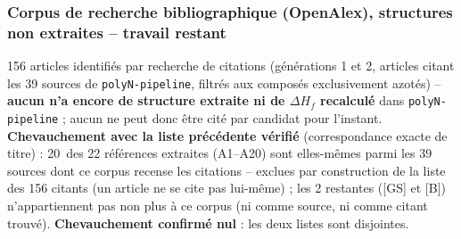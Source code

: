 \subsubsection*{Corpus de recherche bibliographique (OpenAlex), structures non extraites -- travail restant}
156 articles identifi\'es par recherche de citations (g\'en\'erations 1 et 2, articles citant les 39 sources de \texttt{polyN-pipeline}, filtr\'es aux compos\'es exclusivement azot\'es) -- \textbf{aucun n'a encore de structure extraite ni de $\Delta H_f$ recalcul\'e} dans \texttt{polyN-pipeline} ; aucun ne peut donc \^etre cit\'e par candidat pour l'instant. \textbf{Chevauchement avec la liste pr\'ec\'edente v\'erifi\'e} (correspondance exacte de titre) : 20~des 22 r\'ef\'erences extraites (A1--A20) sont elles-m\^emes parmi les 39 sources dont ce corpus recense les citations -- exclues par construction de la liste des 156 citants (un article ne se cite pas lui-m\^eme) ; les 2 restantes ([GS] et [B]) n'appartiennent pas non plus \`a ce corpus (ni comme source, ni comme citant trouv\'e). \textbf{Chevauchement confirm\'e nul} : les deux listes sont disjointes.
